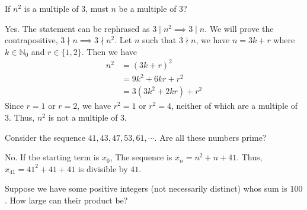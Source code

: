 \documentclass[12pt]{article}
\begin{document}
\begin{question}
    If $n^{2}$ is a multiple of $3$, must $n$ be a multiple of $3$?
\end{question}
\begin{answer}
    Yes.
    The statement can be rephrased as $3 \mid n^{2} \implies 3 \mid n$.
    We will prove the contrapositive, $3 \nmid n \implies 3 \nmid n^{2}$.
    Let $n$ such that $3 \nmid n$, we have $n = 3k + r$
    where $k \in \mathbb{N}_0$ and $r \in \{1,2\}$.
    Then we have
    \begin{align*}
        n^{2} &= (3k + r)^{2}\\
              &= 9k^{2} + 6kr + r^{2}\\
              &= 3(3k^{2} + 2kr) + r^{2}
    \end{align*}
    Since $r = 1$ or $r = 2$, we have $r^{2} = 1$ or $r^{2} = 4$,
    neither of which are a multiple of $3$.
    Thus, $n^{2}$ is not a multiple of $3$.
\end{answer}


\begin{question}
    Consider the sequence $41,43,47,53,61,\cdots$.
    Are all these numbers prime?
\end{question}
\begin{answer}
    No.
    If the starting term is $x_{0}$, The sequence is $x_n = n^{2} + n + 41$.
    Thus, $x_{41} = 41^{2} + 41 + 41$ is divisible by $41$.
\end{answer}

\begin{question}
    
\end{question}

\begin{question}
    Suppose we have some positive integers (not necessarily distinct)
    whos sum is $100$. How large can their product be?
\end{question}
\end{document}
